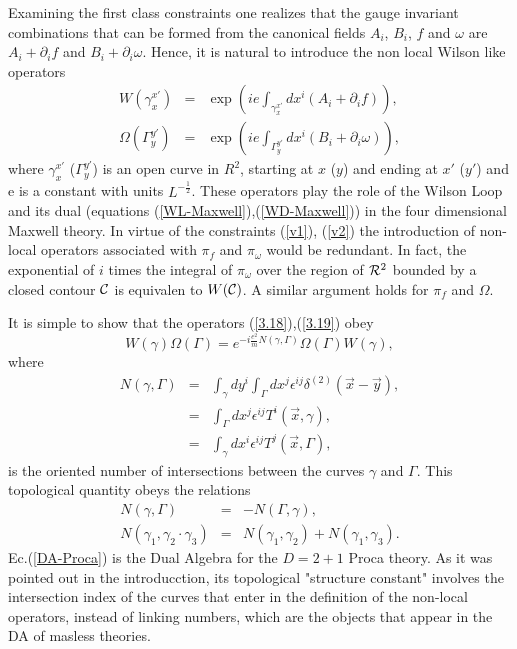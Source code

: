 \documentclass[a4paper,12pt]{article}
\newcommand{\eref}[1]{(\ref{#1})}
\renewcommand{\sup}[1]{^{(#1)}}
\newcommand{\dxy}{\delta\sup 2(\vec x-\vec y)}
\begin{document}
Examining the first class constraints one realizes that the gauge invariant
combinations that can be formed from the canonical fields $A_i$, $B_i$, $f$
and $\omega$ are $A_i+\partial_if$ and $B_i+\partial_i\omega$. Hence, it is
natural to introduce the non local Wilson like operators
\begin{eqnarray}
W(\gamma_x^{x'})&=&\exp{\left(ie\int_{\gamma_x^{x'}}dx^i
\left(A_i+\partial_i f\right)\right)},\label{3.18}\\
\Omega(\Gamma_y^{y'})&=&\exp{\left(ie\int_{\Gamma_y^{y'}}dx^i
\left(B_i+\partial_i\omega\right)\right),}\label{3.19}
\end{eqnarray}
where $\gamma_x^{x'}$ ($\Gamma_y^{y'}$) is an open curve in $R^2$, starting
at $x$ ($y$) and ending at $x'$ ($y'$) and e is a constant with units
$L^{-\frac 12}$. These operators play the role of the
Wilson Loop and its dual (equations \eref{WL-Maxwell},\eref{WD-Maxwell}) in
the four dimensional Maxwell theory. In virtue of the constraints 
\eref{v1}, \eref{v2} the introduction of non-local operators associated 
with $\pi_f$ and $\pi_{\omega}$ would be redundant. In fact, the exponential 
of $i$ times the integral of $\pi_{\omega}$ over the region of ${\cal R}^2$
bounded by a closed contour $\cal C$ is equivalen to $W(\cal C)$. A similar argument 
holds for $\pi_f$ and $\Omega$.

It is simple to show that the operators
\eref{3.18},\eref{3.19} obey
\begin{equation}
W(\gamma)\Omega(\Gamma)=e^{-i{\frac {e^2}m}N(\gamma,\Gamma)}\Omega(\Gamma)W(\gamma),
\label{DA-Proca}
\end{equation}
where
\begin{eqnarray}
N(\gamma,\Gamma)&=&\int_\gamma dy^i\int_\Gamma dx^j\epsilon^{ij}\dxy,\nonumber \\
&=&\int_{\Gamma} dx^j\epsilon^{ij}T^i(\vec x,\gamma), \nonumber \\
&=&\int_{\gamma} dx^i\epsilon^{ij}T^j(\vec x,\Gamma),
\label{NumCort}
\end{eqnarray}
is the oriented number of intersections between the curves $\gamma$ and
$\Gamma$. This topological quantity obeys the relations
\begin{eqnarray}
N(\gamma,\Gamma)&=&-N(\Gamma,\gamma),\\
N(\gamma_1,\gamma_2\cdot\gamma_3)&=&N(\gamma_1,\gamma_2)+
N(\gamma_1,\gamma_3).
\end{eqnarray}
Ec.\eref{DA-Proca} is the Dual Algebra for the $D=2+1$ Proca
theory. As it was pointed out in the introducction, its
topological "structure constant" involves the intersection index
of the curves that enter in the definition of the non-local
operators, instead of linking numbers, which are the objects that
appear in the DA of masless theories\cite{LL}.
\end{document}
